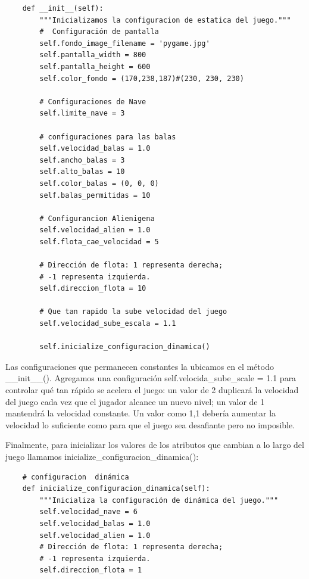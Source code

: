 \hspace{-2.75cm}{\ttfamily \scriptsize configurar.py}  \vspace{-0.5cm}
\begin{lstlisting}	
    def __init__(self):
        """Inicializamos la configuracion de estatica del juego."""
        #  Configuración de pantalla    
        self.fondo_image_filename = 'pygame.jpg' 
        self.pantalla_width = 800
        self.pantalla_height = 600
        self.color_fondo = (170,238,187)#(230, 230, 230)

        # Configuraciones de Nave        
        self.limite_nave = 3

        # configuraciones para las balas
        self.velocidad_balas = 1.0
        self.ancho_balas = 3
        self.alto_balas = 10
        self.color_balas = (0, 0, 0)
        self.balas_permitidas = 10

        # Configurancion Alienigena
        self.velocidad_alien = 1.0 
        self.flota_cae_velocidad = 5
        
        # Dirección de flota: 1 representa derecha;
        # -1 representa izquierda.
        self.direccion_flota = 10  
       
        # Que tan rapido la sube velocidad del juego
        self.velocidad_sube_escala = 1.1

        self.inicialize_configuracion_dinamica()

\end{lstlisting}


Las configuraciones que permanecen constantes la ubicamos en el método {\ttfamily \_\_init\_\_()}. 
Agregamos una configuración {\ttfamily  self.velocida\_sube\_scale = 1.1} para controlar qué tan rápido se acelera el juego: un valor de 2 duplicará la velocidad del juego cada vez que el jugador alcance un nuevo nivel; un valor de 1 mantendrá la velocidad constante. Un valor como 1,1 debería aumentar la velocidad lo suficiente como para que el juego sea desafiante pero no imposible. 

Finalmente, para inicializar los valores de los atributos que cambian a lo largo del juego llamamos  {\ttfamily inicialize\_configuracion\_dinamica()}:



\hspace{-2.75cm}{\ttfamily \scriptsize configurar.py}  \vspace{-0.5cm}
\begin{lstlisting}	
    # configuracion  dinámica
    def inicialize_configuracion_dinamica(self):
        """Inicializa la configuración de dinámica del juego."""
        self.velocidad_nave = 6
        self.velocidad_balas = 1.0
        self.velocidad_alien = 1.0 
        # Dirección de flota: 1 representa derecha;
        # -1 representa izquierda.
        self.direccion_flota = 1
\end{lstlisting}


